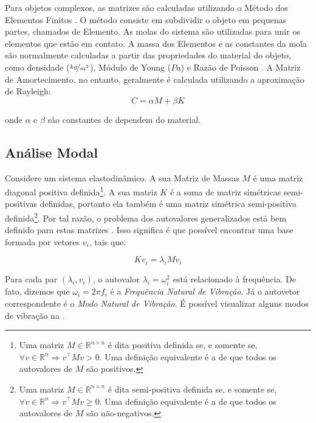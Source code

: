 Para objetos complexos, as matrizes são calculadas utilizando o Método dos Elementos Finitos \cite{hughes2012finite}. O método consiste em subdividir o objeto em pequenas partes, chamados de Elemento. As molas do sistema são utilizadas para unir os elementos que estão em contato. A massa dos Elementos e as constantes da mola são normalmente calculadas a partir das propriedades do material do objeto, como densidade ($\nicefrac{kg}{m^3}$), Módulo de Young ($Pa$) e Razão de Poisson \cite{shabana2012theory}. A Matriz de Amortecimento, no entanto, geralmente é calculada utilizando a aproximação de Rayleigh:
\begin{equation}
C = \alpha M + \beta{K}
\label{rayleighdamping}
\end{equation}

onde $\alpha$ e $\beta$ são constantes de dependem do material.

\subsection{Análise Modal}

Considere um sistema elastodinâmico. A sua Matriz de Massas $M$ é uma matriz diagonal positiva definida\footnote{Uma matriz $M \in \mathbb{R}^{n\times n}$ é dita positiva definida se, e somente se, $\forall v \in \mathbb{R}^n \Rightarrow v^\intercal M v > 0$. Uma definição equivalente é a de que todos os autovalores de $M$ são positivos.}. A sua matriz $K$ é a soma de matriz simétricas semi-positivas definidas, portanto ela também é uma matriz simétrica semi-positiva definida\footnote{Uma matriz $M \in \mathbb{R}^{n\times n}$ é dita semi-positiva definida se, e somente se, $\forall v \in \mathbb{R}^n \Rightarrow v^\intercal M v \ge 0$. Uma definição equivalente é a de que todos os autovalores de $M$ são não-negativos.}. Por tal razão, o problema dos autovalores generalizados está bem definido para estas matrizes \cite{parlett1980symmetric}. Isso significa é que possível encontrar uma base formada por vetores $v_i$, tais que:

\begin{equation}
	Kv_i = \lambda_i M v_i \label{eq:mode_scalar}
\end{equation}

Para cada par $(\lambda_i, v_i)$, o autovalor $\lambda_i = \omega_i^2$ está relacionado à frequência. De fato, dizemos que $\omega_i = 2\pi f_i$ é a \emph{Frequência Natural de Vibração}. Já o autovetor correspondente é o \emph{Modo Natural de Vibração}. É possível visualizar alguns modos de vibração na .

